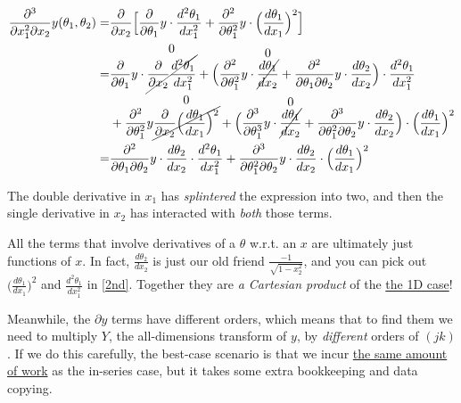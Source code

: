 \documentclass[10pt]{article}
\begin{document}
\begin{align*}
\frac{\partial^3}{\partial x_1^2 \partial x_2} y(\theta_1, \theta_2) =& \frac{\partial}{\partial x_2} \Big[ \frac{\partial}{\partial \theta_1} y \cdot \frac{d^2 \theta_1}{dx_1^2} + \frac{\partial^2}{\partial \theta_1^2} y \cdot \Big( \frac{d \theta_1}{dx_1} \Big)^2 \Big]\\
=& \frac{\partial}{\partial \theta_1} y \cdot \overset{\text{\normalsize 0}}{\cancel{\frac{\partial}{\partial x_2} \frac{d^2 \theta_1}{dx_1^2}}} + \Big( \frac{\partial^2}{\partial \theta_1^2} y \cdot \overset{\text{\normalsize 0}}{\cancel{\frac{d\theta_1}{dx_2}}} + \frac{\partial^2}{\partial \theta_1 \partial \theta_2} y \cdot \frac{d \theta_2}{dx_2} \Big) \cdot \frac{d^2\theta_1}{dx_1^2} \\
&+ \frac{\partial^2}{\partial \theta_1^2} y \overset{\text{\normalsize 0}}{\cancel{\frac{\partial}{\partial x_2} \Big( \frac{d\theta_1}{dx_1} \Big)^2}} + \Big( \frac{\partial^3}{\partial \theta_1^3} y \cdot \overset{\text{\normalsize 0}}{\cancel{\frac{d\theta_1}{dx_2}}} + \frac{\partial^3}{\partial \theta_1^2 \partial \theta_2} y \cdot \frac{d \theta_2}{dx_2} \Big) \cdot \Big(\frac{d\theta_1}{dx_1}\Big)^2 \\
=& \frac{\partial^2}{\partial \theta_1 \partial \theta_2} y \cdot \frac{d \theta_2}{dx_2} \cdot \frac{d^2\theta_1}{dx_1^2} + \frac{\partial^3}{\partial \theta_1^2 \partial \theta_2} y \cdot \frac{d \theta_2}{dx_2} \cdot \Big(\frac{d\theta_1}{dx_1}\Big)^2
\end{align*}

The double derivative in $x_1$ has \textit{splintered} the expression into two, and then the single derivative in $x_2$ has interacted with \textit{both} those terms.

All the terms that involve derivatives of a $\theta$ w.r.t. an $x$ are ultimately just functions of $x$. In fact, $\frac{d\theta_2}{dx_2}$ is just our old friend $\frac{-1}{\sqrt{1-x_2^2}}$, and you can pick out $\big( \frac{d\theta_1}{dx_1} \big)^2$ and $\frac{d^2\theta_1}{dx_1^2}$ in \autoref{2nd}. Together they are \textit{a Cartesian product} of the \hyperref[pyramid]{the 1D case}!

Meanwhile, the $\partial y$ terms have different orders, which means that to find them we need to multiply $Y$, the all-dimensions transform of $y$, by \textit{different} orders of $(jk)$. If we do this carefully, the best-case scenario is that we incur \href{https://github.com/pavelkomarov/spectral-derivatives/issues/2}{the same amount of work} as the in-series case, but it takes some extra bookkeeping and data copying.
\end{document}
